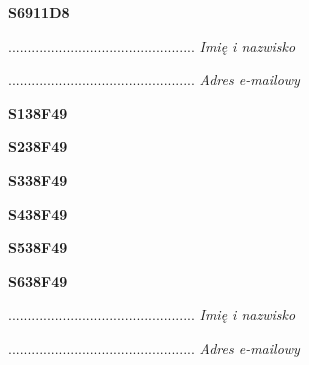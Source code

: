 \begin{turn}{90}\huge \textbf{S6911D8}\end{turn}

\begin{turn}{90}\begin{minipage}{\linewidth} \vspace{20mm} ................................................  \textit{Imię i nazwisko}\end{minipage}\end{turn}

\begin{turn}{90}\begin{minipage}{\linewidth} \vspace{20mm} ................................................  \textit{Adres e-mailowy}\end{minipage}\end{turn}

\begin{turn}{90}\huge \textbf{S138F49}\end{turn}

\begin{turn}{90}\huge \textbf{S238F49}\end{turn}

\begin{turn}{90}\huge \textbf{S338F49}\end{turn}

\begin{turn}{90}\huge \textbf{S438F49}\end{turn}

\begin{turn}{90}\huge \textbf{S538F49}\end{turn}

\begin{turn}{90}\huge \textbf{S638F49}\end{turn}

\begin{turn}{90}\begin{minipage}{\linewidth} \vspace{20mm} ................................................  \textit{Imię i nazwisko}\end{minipage}\end{turn}

\begin{turn}{90}\begin{minipage}{\linewidth} \vspace{20mm} ................................................  \textit{Adres e-mailowy}\end{minipage}\end{turn}

